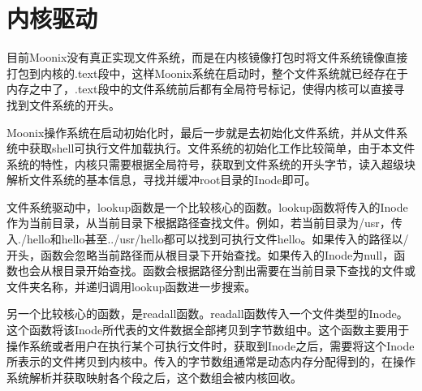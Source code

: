 \section{内核驱动}

目前Moonix没有真正实现文件系统，而是在内核镜像打包时将文件系统镜像直接打包到内核的.text段中，这样Moonix系统在启动时，整个文件系统就已经存在于内存之中了，.text段中的文件系统前后都有全局符号标记，使得内核可以直接寻找到文件系统的开头。

Moonix操作系统在启动初始化时，最后一步就是去初始化文件系统，并从文件系统中获取shell可执行文件加载执行。文件系统的初始化工作比较简单，由于本文件系统的特性，内核只需要根据全局符号，获取到文件系统的开头字节，读入超级块解析文件系统的基本信息，寻找并缓冲root目录的Inode即可。

文件系统驱动中，lookup函数是一个比较核心的函数。lookup函数将传入的Inode作为当前目录，从当前目录下根据路径查找文件。例如，若当前目录为/usr，传入./hello和hello甚至../usr/hello都可以找到可执行文件hello。如果传入的路径以/开头，函数会忽略当前路径而从根目录下开始查找。如果传入的Inode为null，函数也会从根目录开始查找。函数会根据路径分割出需要在当前目录下查找的文件或文件夹名称，并递归调用lookup函数进一步搜索。

另一个比较核心的函数，是readall函数。readall函数传入一个文件类型的Inode。这个函数将该Inode所代表的文件数据全部拷贝到字节数组中。这个函数主要用于操作系统或者用户在执行某个可执行文件时，获取到Inode之后，需要将这个Inode所表示的文件拷贝到内核中。传入的字节数组通常是动态内存分配得到的，在操作系统解析并获取映射各个段之后，这个数组会被内核回收。